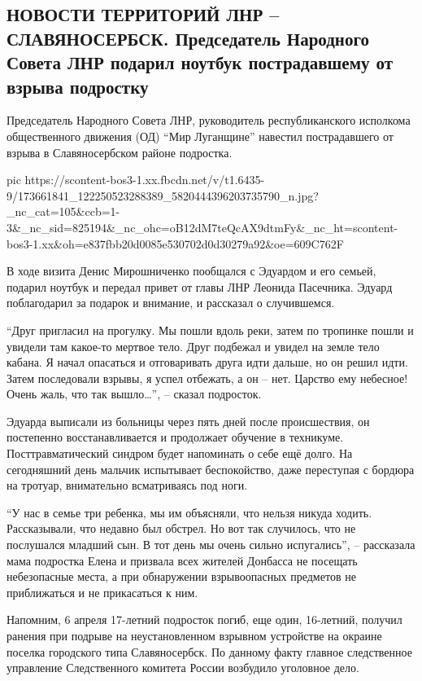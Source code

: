  
 
 
 
 

\subsection{НОВОСТИ ТЕРРИТОРИЙ ЛНР – СЛАВЯНОСЕРБСК. Председатель Народного Совета ЛНР подарил ноутбук пострадавшему от взрыва подростку}
\label{sec:14_04_2021.fb.respublikalnr.7.slavjanoserbsk_lnr_podrostok_noutbuk}

Председатель Народного Совета ЛНР, руководитель республиканского исполкома
общественного движения (ОД) \enquote{Мир Луганщине} навестил пострадавшего от взрыва в
Славяносербском районе подростка. 


\ifcmt
  pic https://scontent-bos3-1.xx.fbcdn.net/v/t1.6435-9/173661841_122250523288389_5820444396203735790_n.jpg?_nc_cat=105&ccb=1-3&_nc_sid=825194&_nc_ohc=oB12dM7teQcAX9dtmFy&_nc_ht=scontent-bos3-1.xx&oh=e837fbb20d0085e530702d0d30279a92&oe=609C762F
\fi


В ходе визита Денис Мирошниченко пообщался с Эдуардом и его семьей, подарил
ноутбук и передал привет от главы ЛНР Леонида Пасечника. Эдуард поблагодарил за
подарок и внимание, и рассказал о случившемся.

\enquote{Друг пригласил на прогулку. Мы пошли вдоль реки, затем по тропинке пошли и
увидели там какое-то мертвое тело. Друг подбежал и увидел на земле тело кабана.
Я начал опасаться и отговаривать друга идти дальше, но он решил идти. Затем
последовали взрывы, я успел отбежать, а он – нет. Царство ему небесное! Очень
жаль, что так вышло…}, – сказал подросток.

Эдуарда выписали из больницы через пять дней после происшествия, он постепенно
восстанавливается и продолжает обучение в техникуме. Посттравматический синдром
будет напоминать о себе ещё долго. На сегодняшний день мальчик испытывает
беспокойство, даже переступая с бордюра на тротуар, внимательно всматриваясь
под ноги. 

\enquote{У нас в семье три ребенка, мы им объясняли, что нельзя никуда ходить.
Рассказывали, что недавно был обстрел. Но вот так случилось, что не послушался
младший сын. В тот день мы очень сильно испугались}, – рассказала мама
подростка Елена и призвала всех жителей Донбасса не посещать небезопасные
места, а при обнаружении взрывоопасных предметов не приближаться и не
прикасаться к ним.

Напомним, 6 апреля 17-летний подросток погиб, еще один, 16-летний, получил
ранения при подрыве на неустановленном взрывном устройстве на окраине поселка
городского типа Славяносербск. По данному факту главное следственное управление
Следственного комитета России возбудило уголовное дело.
